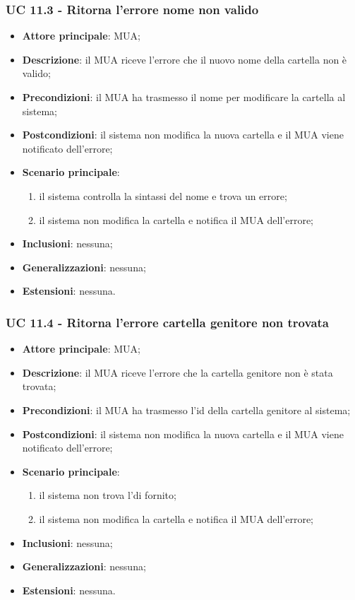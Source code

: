 \subsubsection{UC 11.3 - Ritorna l'errore nome non valido} \label{sec:UC11.3}
\begin{itemize}
    \item \textbf{Attore principale}: MUA;
    \item \textbf{Descrizione}: il MUA riceve l'errore che il nuovo nome della cartella non è valido;
    \item \textbf{Precondizioni}:  il MUA ha trasmesso il nome per modificare la cartella al sistema;
    \item \textbf{Postcondizioni}: il sistema non modifica la nuova cartella e il MUA viene notificato dell'errore;
    \item \textbf{Scenario principale}:
        \begin{enumerate}
            \item il sistema controlla la sintassi del nome e trova un errore;
            \item il sistema non modifica la cartella e notifica il MUA dell'errore;
        \end{enumerate}
    \item \textbf{Inclusioni}: nessuna;
    \item \textbf{Generalizzazioni}: nessuna;
    \item \textbf{Estensioni}: nessuna.
\end{itemize}

\subsubsection{UC 11.4 - Ritorna l'errore cartella genitore non trovata} \label{sec:UC11.4}
\begin{itemize}
    \item \textbf{Attore principale}: MUA;
    \item \textbf{Descrizione}: il MUA riceve l'errore che la cartella genitore non è stata trovata;
    \item \textbf{Precondizioni}: il MUA ha trasmesso l'id della cartella genitore al sistema;
    \item \textbf{Postcondizioni}: il sistema non modifica la nuova cartella e il MUA viene notificato dell'errore;
    \item \textbf{Scenario principale}:
        \begin{enumerate}
            \item il sistema non trova l'di fornito;
            \item il sistema non modifica la cartella e notifica il MUA dell'errore;
        \end{enumerate}
    \item \textbf{Inclusioni}: nessuna;
    \item \textbf{Generalizzazioni}: nessuna;
    \item \textbf{Estensioni}: nessuna.
\end{itemize}

